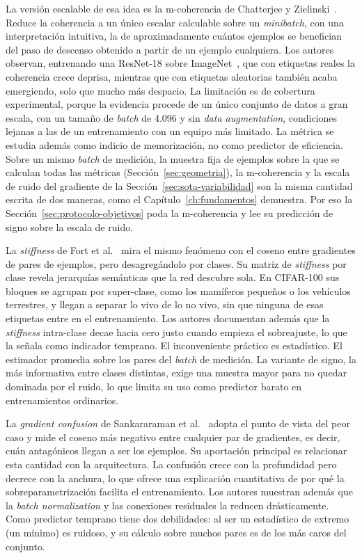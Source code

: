 La versión escalable de esa idea es la m-coherencia de Chatterjee y Zielinski~\cite{chatterjee2020making}. Reduce la coherencia a un único escalar calculable sobre un \emph{minibatch}, con una interpretación intuitiva, la de aproximadamente cuántos ejemplos se benefician del paso de descenso obtenido a partir de un ejemplo cualquiera. Los autores observan, entrenando una ResNet-18 sobre ImageNet~\cite{russakovsky2015imagenet}, que con etiquetas reales la coherencia crece deprisa, mientras que con etiquetas aleatorias también acaba emergiendo, solo que mucho más despacio. La limitación es de cobertura experimental, porque la evidencia procede de un único conjunto de datos a gran escala, con un tamaño de \emph{batch} de 4.096 y sin \emph{data augmentation}, condiciones lejanas a las de un entrenamiento con un equipo más limitado. La métrica se estudia además como indicio de memorización, no como predictor de eficiencia. Sobre un mismo \emph{batch} de medición, la muestra fija de ejemplos sobre la que se calculan todas las métricas (Sección~\ref{sec:geometria}), la m-coherencia y la escala de ruido del gradiente de la Sección~\ref{sec:sota-variabilidad} son la misma cantidad escrita de dos maneras, como el Capítulo~\ref{ch:fundamentos} demuestra. Por eso la Sección~\ref{sec:protocolo-objetivos} poda la m-coherencia y lee su predicción de signo sobre la escala de ruido.

La \emph{stiffness} de Fort et al.~\cite{fort2019stiffness} mira el mismo fenómeno con el coseno entre gradientes de pares de ejemplos, pero desagregándolo por clases. Su matriz de \emph{stiffness} por clase revela jerarquías semánticas que la red descubre sola. En CIFAR-100 sus bloques se agrupan por super-clase, como los mamíferos pequeños o los vehículos terrestres, y llegan a separar lo vivo de lo no vivo, sin que ninguna de esas etiquetas entre en el entrenamiento. Los autores documentan además que la \emph{stiffness} intra-clase decae hacia cero justo cuando empieza el sobreajuste, lo que la señala como indicador temprano. El inconveniente práctico es estadístico. El estimador promedia sobre los pares del \emph{batch} de medición. La variante de signo, la más informativa entre clases distintas, exige una muestra mayor para no quedar dominada por el ruido, lo que limita su uso como predictor barato en entrenamientos ordinarios.

La \emph{gradient confusion} de Sankararaman et al.~\cite{sankararaman2020impact} adopta el punto de vista del peor caso y mide el coseno más negativo entre cualquier par de gradientes, es decir, cuán antagónicos llegan a ser los ejemplos. Su aportación principal es relacionar esta cantidad con la arquitectura. La confusión crece con la profundidad pero decrece con la anchura, lo que ofrece una explicación cuantitativa de por qué la sobreparametrización facilita el entrenamiento. Los autores muestran además que la \emph{batch normalization} y las conexiones residuales la reducen drásticamente. Como predictor temprano tiene dos debilidades: al ser un estadístico de extremo (un mínimo) es ruidoso, y su cálculo sobre muchos pares es de los más caros del conjunto.

